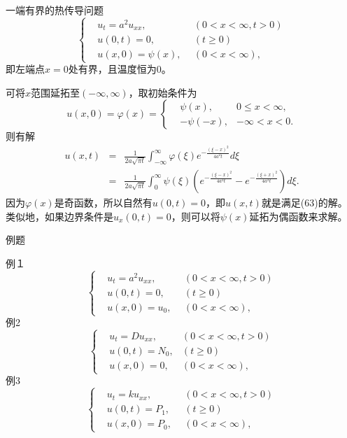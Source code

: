 \documentclass[11pt]{beamer}
\begin{document}
\begin{frame}{一端有界的热传导问题}
\begin{equation}
\left\{
\begin{aligned}
& u_t = a^2 u_{xx}, ~~  & ( 0 < x < \infty, t>0) \\
& u(0,t) = 0,  & ( t \geq 0) \\
& u(x,0) = \psi(x), ~~ & ( 0 <x< \infty ),
\end{aligned}
\right.
\end{equation}
即左端点$x=0$处有界，且温度恒为0。

可将$x$范围延拓至$(-\infty, \infty)$，取初始条件为
\begin{equation}
u(x,0) = \varphi(x) = \left\{
\begin{aligned}
& \psi(x),  & 0 \leq x < \infty , \\
& - \psi(-x), & -\infty < x < 0.
\end{aligned}
\right.
\end{equation}
则有解
\begin{eqnarray}
u(x,t) &=& \frac{1}{2a\sqrt{\pi t}} \int^\infty_{-\infty} \varphi(\xi) e^{ - \frac{(\xi - x)^2}{4a^2 t} } d \xi  \nonumber \\
&=& \frac{1}{2a\sqrt{\pi t}} \int^\infty_0 \psi(\xi) ( e^{ - \frac{(\xi - x)^2}{4a^2 t} } - e^{-\frac{(\xi + x)^2}{4a^2 t}} ) d \xi.
\end{eqnarray}
因为$\varphi(x)$是奇函数，所以自然有$u(0,t)=0$，即$u(x,t)$就是满足(63)的解。
类似地，如果边界条件是$u_x(0,t)=0$，则可以将$\psi(x)$延拓为偶函数来求解。
\end{frame}

\begin{frame}{例题}

例１
\begin{equation}
\left\{
\begin{aligned}
& u_t = a^2 u_{xx}, ~~  & ( 0 < x < \infty, t>0) \\
& u(0,t) = 0,  & ( t \geq 0) \\
& u(x,0) = u_0, ~~ & ( 0 <x< \infty ),
\end{aligned}
\right.
\end{equation}
例2
\begin{equation}
\left\{
\begin{aligned}
& u_t = D u_{xx}, ~~  & ( 0 < x < \infty, t>0) \\
& u(0,t) = N_0,  & ( t \geq 0) \\
& u(x,0) = 0, ~~ & ( 0 <x< \infty ),
\end{aligned}
\right.
\end{equation}
例3
\begin{equation}
\left\{
\begin{aligned}
& u_t = k u_{xx}, ~~  & ( 0 < x < \infty, t>0) \\
& u(0,t) = P_1,  & ( t \geq 0) \\
& u(x,0) = P_0, ~~ & ( 0 <x< \infty ),
\end{aligned}
\right.
\end{equation}
\end{frame}
\end{document}
